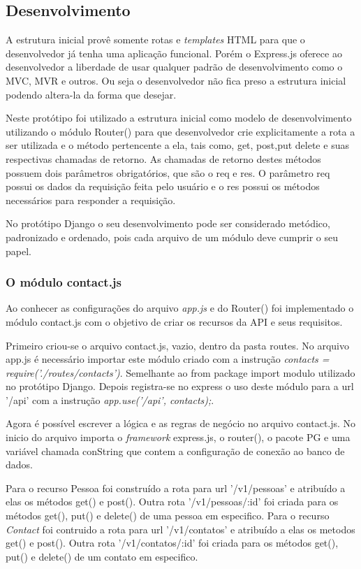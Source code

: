 \subsection{Desenvolvimento}
  
  A estrutura inicial provê somente rotas e \textit{templates} HTML para que o desenvolvedor já tenha uma aplicação funcional.
  Porém o Express.js oferece ao desenvolvedor a liberdade de usar qualquer padrão de desenvolvimento como o MVC, MVR e 
  outros. Ou seja o desenvolvedor não fica preso a estrutura inicial podendo altera-la da forma que desejar. 
  
  Neste protótipo foi utilizado a estrutura inicial como modelo de desenvolvimento utilizando o módulo Router() para que desenvolvedor
  crie explicitamente a rota a ser utilizada e o método pertencente a ela, tais como, get, post,put delete e suas respectivas
  chamadas de retorno. As chamadas de retorno destes métodos possuem dois parâmetros obrigatórios, que são o req e res. O parâmetro
  req possui os dados da requisição feita pelo usuário e o res possui os métodos necessários para responder a requisição.
  
  No protótipo Django o seu desenvolvimento pode ser considerado metódico, padronizado e ordenado, pois cada arquivo de um módulo
  deve cumprir o seu papel.

\subsubsection{O módulo contact.js }

  Ao conhecer as configurações do arquivo \textit{app.js} e do Router() foi implementado o módulo contact.js com o objetivo
  de criar os recursos da API e seus requisitos.
  
  Primeiro criou-se o arquivo contact.js, vazio, dentro da pasta routes. No arquivo app.js é necessário importar este módulo criado com a
  instrução \textit{contacts = require('./routes/contacts')}. Semelhante ao from package import modulo utilizado no protótipo Django. Depois 
  registra-se no express o uso deste módulo para a url '/api' com a instrução \textit{app.use('/api', contacts);}.
  
  Agora é possível escrever a lógica e as regras de negócio no arquivo contact.js. No inicio do arquivo importa o \textit{framework}
  express.js, o router(), o pacote PG e uma variável chamada conString que contem a configuração de conexão ao banco de dados.
  
  Para o recurso Pessoa foi construído a rota para url '/v1/pessoas' e atribuído a elas os métodos get() e post(). Outra rota 
  '/v1/pessoas/:id' foi criada para os métodos get(), put() e delete() de uma pessoa em especifico. Para o recurso \textit{Contact} foi 
  contruido a rota para url '/v1/contatos' e atribuído a elas os metodos get() e post(). Outra rota 
  '/v1/contatos/:id' foi criada para os métodos get(), put() e delete() de um contato em especifico.
  

